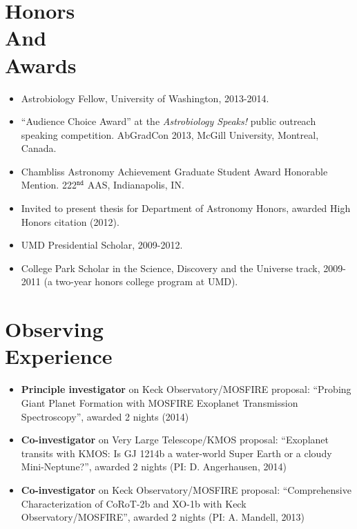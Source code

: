 \documentclass[margin]{res}
\begin{document}
\begin{resume}
\section{Honors\\And\\Awards} 
\begin{itemize}   
\item Astrobiology Fellow, University of Washington, 2013-2014.

\item ``Audience Choice Award'' at the \textit{Astrobiology Speaks!} public outreach speaking competition. AbGradCon 2013, McGill University, Montreal, Canada. 

\item Chambliss Astronomy Achievement Graduate Student Award Honorable Mention. 222$^{\mathtt{nd}}$ AAS, Indianapolis, IN.

\item Invited to present thesis for Department of Astronomy Honors, awarded High Honors citation (2012).

\item UMD Presidential Scholar, 2009-2012.

\item College Park Scholar in the Science, Discovery and the Universe track, 2009-2011 (a two-year honors college program at UMD). \\
\end{itemize}
                 
\section{Observing\\Experience}
\begin{itemize}   
\item {\bf Principle investigator} on Keck Observatory/MOSFIRE proposal: ``Probing Giant Planet Formation with MOSFIRE Exoplanet Transmission Spectroscopy'', awarded 2 nights (2014)

\item {\bf Co-investigator} on Very Large Telescope/KMOS proposal: ``Exoplanet transits with KMOS: Is GJ 1214b a water-world Super Earth or a cloudy Mini-Neptune?'', awarded 2 nights (PI: D. Angerhausen, 2014)

\item {\bf Co-investigator} on Keck Observatory/MOSFIRE proposal: ``Comprehensive Characterization of CoRoT-2b and XO-1b with Keck Observatory/MOSFIRE'', awarded 2 nights (PI: A. Mandell, 2013)


\end{itemize}
\end{resume}
\end{document}
